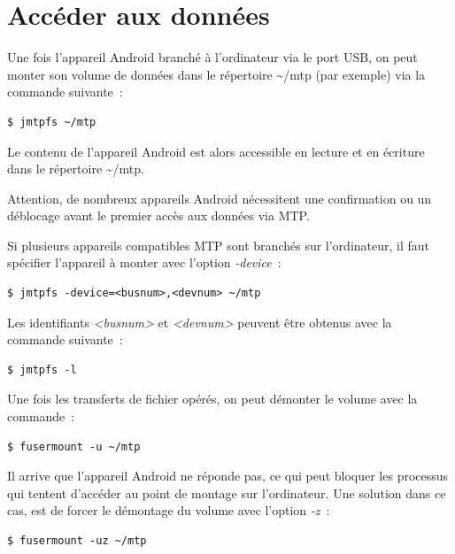 \documentclass{article}
\begin{document}
\section*{Accéder aux données}\label{sec:intall-qemu}

Une fois l'appareil Android branché à l'ordinateur via le port USB,
on peut monter son volume de données dans le répertoire
\textasciitilde{}/mtp (par exemple) via la commande suivante~:
\begin{verbatim}
$ jmtpfs ~/mtp
\end{verbatim}

Le contenu de l'appareil Android est alors accessible en lecture et en écriture
dans le répertoire \textasciitilde{}/mtp.

Attention, de nombreux appareils Android nécessitent une confirmation ou un
déblocage avant le premier accès aux données via MTP.

Si plusieurs appareils compatibles MTP sont branchés sur l'ordinateur, il faut
spécifier l'appareil à monter avec l'option {\em -device}~:

\begin{verbatim}
$ jmtpfs -device=<busnum>,<devnum> ~/mtp
\end{verbatim}

Les identifiants {\em <busnum>} et {\em <devnum>} peuvent être obtenus avec la
commande suivante~:
\begin{verbatim}
$ jmtpfs -l
\end{verbatim}

Une fois les transferts de fichier opérés, on peut démonter le volume avec la
commande~:
\begin{verbatim}
$ fusermount -u ~/mtp
\end{verbatim}

Il arrive que l'appareil Android ne réponde pas, ce qui peut bloquer les
processus qui tentent d'accéder au point de montage sur l'ordinateur.
Une solution dans ce cas, est de forcer le démontage du volume avec l'option
{\em -z}~:
\begin{verbatim}
$ fusermount -uz ~/mtp
\end{verbatim}


\end{document}
